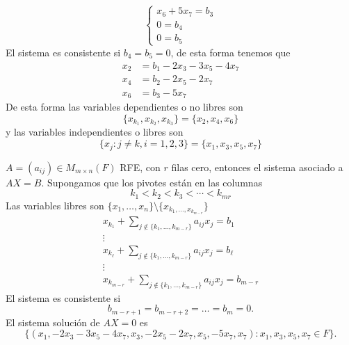 \documentclass[12pt,a4paper]{book}
\begin{document}
\begin{ejemplo}
\begin{equation*}
\begin{cases}
                x_{6}+5x_{7}=b_{3}\\
                0=b_{4}\\
                0=b_{5}
            \end{cases}
        \end{equation*}
        El sistema es consistente si $b_{4}=b_{5}=0$, de esta forma tenemos que
        \begin{align*}
            x_{2}&=b_{1}-2x_{3}-3x_{5}-4x_{7}\\
            x_{4}&=b_{2}-2x_{5}-2x_{7}\\
            x_{6}&=b_{3}-5x_{7}
        \end{align*}
        De esta forma las variables dependientes o no libres son
        \begin{equation*}
            \{x_{k_{1}},x_{k_{2}},x_{k_{3}}\}=\{x_{2},x_{4},x_{6}\}
        \end{equation*}
        y las variables independientes o libres son
        \begin{equation*}
            \{x_{j}:j\neq k,i=1,2,3\}=\{x_{1},x_{3},x_{5},x_{7}\}
        \end{equation*}
    \end{ejemplo}
    $A=(a_{ij})\in M_{m\times n}(F)$ RFE, con $r$ filas cero, entonces el sistema asociado a $AX=B$. Supongamos que los pivotes están en las columnas
    \begin{equation*}
        k_{1}\lt k_{2}\lt k_{3}\lt\cdots\lt k_{mr}
    \end{equation*}
    Las variables libres son $\{x_{1},\dots,x_{n}\}\setminus\{x_{k_{1},\dots,x_{k_{m-r}}}\}$
    \begin{equation*}
        \begin{matrix}
            x_{k_{1}}+\sum_{j\notin\{k_{1},\dots,k_{m-r}\}}a_{ij}x_{j}=b_{1}\\
            \vdots\\
            x_{k_{\ell}}+\sum_{j\notin\{k_{1},\dots,k_{m-r}\}}a_{ij}x_{j}=b_{\ell}\\
            \vdots\\
            x_{k_{m-r}}+\sum_{j\notin\{k_{1},\dots,k_{m-r}\}}a_{ij}x_{j}=b_{m-r}
        \end{matrix}
    \end{equation*}
    El sistema es consistente si
    \begin{equation*}
        b_{m-r+1}=b_{m-r+2}=\dots=b_{m}=0.
    \end{equation*}
    El sistema solución de $AX=0$ es
    \begin{equation*}
        \{(x_{1},-2x_{3}-3x_{5}-4x_{7},x_{3},-2x_{5}-2x_{7},x_{5},-5x_{7},x_{7}):x_{1},x_{3},x_{5},x_{7}\in F\}.
    \end{equation*}
\end{document}
